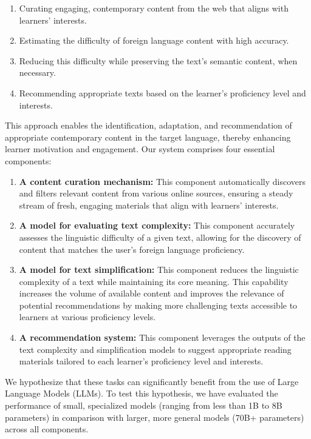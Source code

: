 \begin{enumerate}
    \item Curating engaging, contemporary content from the web that aligns with learners' interests.
    \item Estimating the difficulty of foreign language content with high accuracy.
    \item Reducing this difficulty while preserving the text's semantic content, when necessary.
    \item Recommending appropriate texts based on the learner's proficiency level and interests.
\end{enumerate}

This approach enables the identification, adaptation, and recommendation of appropriate contemporary content in the target language, thereby enhancing learner motivation and engagement. Our system comprises four essential components:

\begin{enumerate}
    \item \textbf{A content curation mechanism:} This component automatically discovers and filters relevant content from various online sources, ensuring a steady stream of fresh, engaging materials that align with learners' interests.

    \item \textbf{A model for evaluating text complexity:} This component accurately assesses the linguistic difficulty of a given text, allowing for the discovery of content that matches the user's foreign language proficiency.

    \item \textbf{A model for text simplification:} This component reduces the linguistic complexity of a text while maintaining its core meaning. This capability increases the volume of available content and improves the relevance of potential recommendations by making more challenging texts accessible to learners at various proficiency levels.

    \item \textbf{A recommendation system:} This component leverages the outputs of the text complexity and simplification models to suggest appropriate reading materials tailored to each learner's proficiency level and interests.
\end{enumerate}

We hypothesize that these tasks can significantly benefit from the use of Large Language Models (LLMs). To test this hypothesis, we have evaluated the performance of small, specialized models (ranging from less than 1B to 8B parameters) in comparison with larger, more general models (70B+ parameters) across all components.

